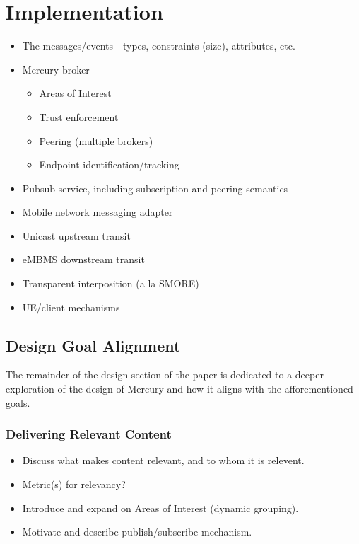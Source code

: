 \section*{Implementation}

\begin{itemize}
\item The messages/events - types, constraints (size), attributes, etc.
\item Mercury broker
  \begin{itemize}
  \item Areas of Interest
  \item Trust enforcement
  \item Peering (multiple brokers)
  \item Endpoint identification/tracking
  \end{itemize}
\item Pubsub service, including subscription and peering semantics
\item Mobile network messaging adapter
\item Unicast upstream transit
\item eMBMS downstream transit
\item Transparent interposition (a la SMORE)
\item UE/client mechanisms
\end{itemize}


\subsection{Design Goal Alignment}

The remainder of the design section of the paper is dedicated to a
deeper exploration of the design of Mercury and how it aligns with the
afforementioned goals.

\subsubsection{Delivering Relevant Content}

\begin{itemize}
\item Discuss what makes content relevant, and to whom it is relevent.
\item Metric(s) for relevancy?
\item Introduce and expand on Areas of Interest (dynamic grouping).
\item Motivate and describe publish/subscribe mechanism.
\end{itemize}

